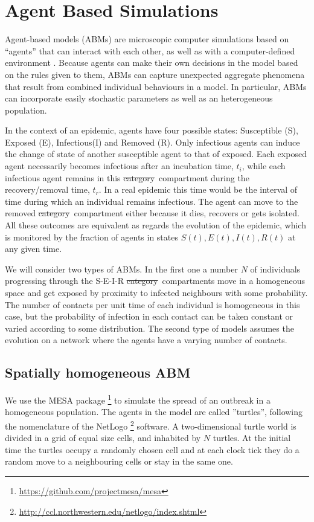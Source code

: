 \documentclass[a4paper,oneside,11pt]{article}
\newcommand{\myreplacement}[2]{\textcolor[rgb]{0.75,0,0.75}{\sout{#1}~#2}}
\begin{document}
\section{Agent Based Simulations}
\label{sec:ABM}

Agent-based models (ABMs) are microscopic computer simulations based on ``agents'' that can interact with each other, as well as with a computer-defined environment \cite{Hunter2017}. Because agents can make their own decisions in the model based on the rules given to them, ABMs can capture unexpected aggregate phenomena that result from combined individual behaviours in a model. In particular, ABMs can incorporate easily stochastic parameters as well as an heterogeneous population.

In the context of an epidemic, agents have four possible states: Susceptible (S), Exposed (E), Infectious(I) and Removed (R). Only infectious agents can induce the change of state of another susceptible agent to that of exposed. Each exposed agent necessarily becomes infectious after an incubation time, $t_i$, while each infectious agent remains in this \myreplacement{category}{compartment} during the recovery/removal time, $t_r$. In a real epidemic this time would be the interval of time during which an individual remains infectious. The agent can move to the removed
\myreplacement{category}{compartment} either because it dies, recovers or gets isolated. All these outcomes are equivalent as regards the evolution of the epidemic, which 
 is monitored by the fraction of agents in states $S(t), E(t), I(t), R(t)$ at any given time. 

We will consider two types of ABMs. In the first one a number $N$ of individuals progressing through the S-E-I-R \myreplacement{category}{compartments} move in a homogeneous space and get exposed by proximity to infected neighbours with some probability. The number of contacts per unit time of each individual is homogeneous in this case, but the probability of infection in each contact can be taken constant or varied according to some distribution.
The second type of models assumes the evolution  on a network where the agents have a varying number of contacts. 

\subsection{Spatially homogeneous ABM}

We use the MESA package \footnote{\url{https://github.com/projectmesa/mesa}} to simulate the spread of an outbreak in a homogeneous population. The agents in the model are called ''turtles'', following the nomenclature of the NetLogo \footnote{\url{http://ccl.northwestern.edu/netlogo/index.shtml}} software. 
A two-dimensional turtle world is divided in a grid of equal size cells, and inhabited by $N$ turtles. At the initial time the turtles occupy a randomly chosen cell and  at each clock tick they do a random move to a neighbouring cells or stay in the same one. 
\end{document}
